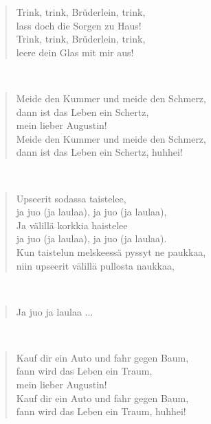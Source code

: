 \noindent\begin{minipage}{\linewidth}
\begin{verse}
	Trink, trink, Brüderlein, trink,\\
	lass doch die Sorgen zu Haus!\\
	Trink, trink, Brüderlein, trink,\\
	leere dein Glas mit mir aus!\\
\end{verse}
\end{minipage}\\[10pt]
\noindent\begin{minipage}{\linewidth}
\begin{verse}
	Meide den Kummer und meide den Schmerz,\\
	dann ist das Leben ein Schertz,\\
	mein lieber Augustin!\\
	Meide den Kummer und meide den Schmerz,\\
	dann ist das Leben ein Schertz, huhhei!\\
\end{verse}
\end{minipage}\\[10pt]
\noindent\begin{minipage}{\linewidth}
\begin{verse}
	Upseerit sodassa taistelee,\\
	ja juo (ja laulaa), ja juo (ja laulaa),\\
	Ja välillä korkkia haistelee\\
	ja juo (ja laulaa), ja juo (ja laulaa).\\
	Kun taistelun melskeessä pyssyt ne paukkaa,\\
	niin upseerit välillä pullosta naukkaa,\\
\end{verse}
\end{minipage}\\[10pt]
\noindent\begin{minipage}{\linewidth}
\begin{verse}
	Ja juo ja laulaa ...\\
\end{verse}
\end{minipage}\\[10pt]
\noindent\begin{minipage}{\linewidth}
\begin{verse}
	Kauf dir ein Auto und fahr gegen Baum,\\
	fann wird das Leben ein Traum,\\
	mein lieber Augustin!\\
	Kauf dir ein Auto und fahr gegen Baum,\\
	fann wird das Leben ein Traum, huhhei!\\
\end{verse}
\end{minipage}\\[10pt]
